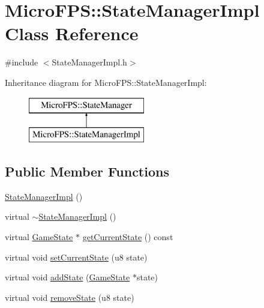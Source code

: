 \hypertarget{class_micro_f_p_s_1_1_state_manager_impl}{
\section{MicroFPS::StateManagerImpl Class Reference}
\label{d9/dc7/class_micro_f_p_s_1_1_state_manager_impl}
}


{\ttfamily \#include $<$StateManagerImpl.h$>$}

Inheritance diagram for MicroFPS::StateManagerImpl:\begin{figure}[H]
\begin{center}
\leavevmode
\includegraphics[height=2.000000cm]{d9/dc7/class_micro_f_p_s_1_1_state_manager_impl}
\end{center}
\end{figure}
\subsection*{Public Member Functions}
\begin{DoxyCompactItemize}
\item 
\hyperlink{class_micro_f_p_s_1_1_state_manager_impl_a07a878c959ca85f31afafcc4639987c0}{StateManagerImpl} ()
\item 
virtual \hyperlink{class_micro_f_p_s_1_1_state_manager_impl_a6f244e71038028b079f301ad98a23266}{$\sim$StateManagerImpl} ()
\item 
virtual \hyperlink{class_micro_f_p_s_1_1_game_state}{GameState} $\ast$ \hyperlink{class_micro_f_p_s_1_1_state_manager_impl_aed21558f8d76cd3dce1a9fc5f76ea3c8}{getCurrentState} () const 
\item 
virtual void \hyperlink{class_micro_f_p_s_1_1_state_manager_impl_a41804476cf431962fdc37d94a7bdb019}{setCurrentState} (u8 state)
\item 
virtual void \hyperlink{class_micro_f_p_s_1_1_state_manager_impl_ae65f3dc55a97a7f19dbb32248fa92dfb}{addState} (\hyperlink{class_micro_f_p_s_1_1_game_state}{GameState} $\ast$state)
\item 
virtual void \hyperlink{class_micro_f_p_s_1_1_state_manager_impl_a0ced4d02b3985b4573d289317e9ebcc4}{removeState} (u8 state)
\end{DoxyCompactItemize}


